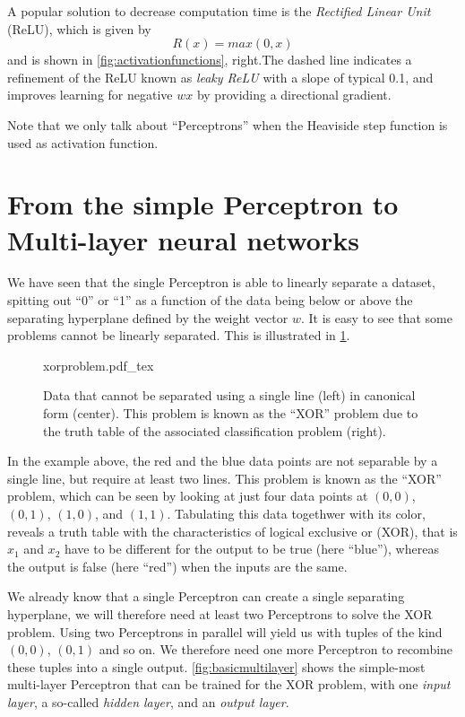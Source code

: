 A popular solution to decrease computation time is the \textsl{Rectified Linear Unit} (ReLU), which is given by
\begin{equation}
R(x)=max(0,x)
\end{equation}
and is shown in \cref{fig:activationfunctions}, right.The dashed line indicates a refinement of the ReLU known as \textsl{leaky ReLU} with a slope of typical 0.1, and improves learning for negative $wx$ by providing a directional gradient.

Note that we only talk about ``Perceptrons'' when the Heaviside step function is used as activation function.

\section{From the simple Perceptron to Multi-layer neural networks}

We have seen that the single Perceptron is able to linearly separate a dataset, spitting out ``0'' or ``1'' as a function of the data being below or above the separating hyperplane defined by the weight vector $w$. It is easy to see that some problems cannot be linearly separated. This is illustrated in \cref{fig:xorproblem}.

\begin{figure}[htb]
    \centering
    \def\svgwidth{0.9\textwidth}
    {xorproblem.pdf_tex}
    \caption{Data that cannot be separated using a single line (left) in canonical form (center). This problem is known as the ``XOR'' problem due to the truth table of the associated classification problem (right).\label{fig:xorproblem}}
\end{figure}

In the example above, the red and the blue data points are not separable by a single line, but require at least two lines. This problem is known as the ``XOR'' problem, which can be seen by looking at just four data points at $(0,0)$, $(0,1)$, $(1,0)$, and $(1,1)$. Tabulating this data togethwer with its color, reveals a truth table with the characteristics of logical exclusive or (XOR), that is $x_1$ and $x_2$ have to be different for the output to be true (here ``blue''), whereas the output is false (here ``red'') when the inputs are the same.

We already know that a single Perceptron can create a single separating hyperplane, we will therefore need at least two Perceptrons to solve the XOR problem. Using two Perceptrons in parallel will yield us with tuples of the kind $(0,0)$, $(0,1)$ and so on. We therefore need one more Perceptron to recombine these tuples into a single output. \cref{fig:basicmultilayer}
shows the simple-most multi-layer Perceptron that can be trained for the XOR problem, with one \textsl{input layer}, a so-called \textsl{hidden layer}, and an \textsl{output layer}.

